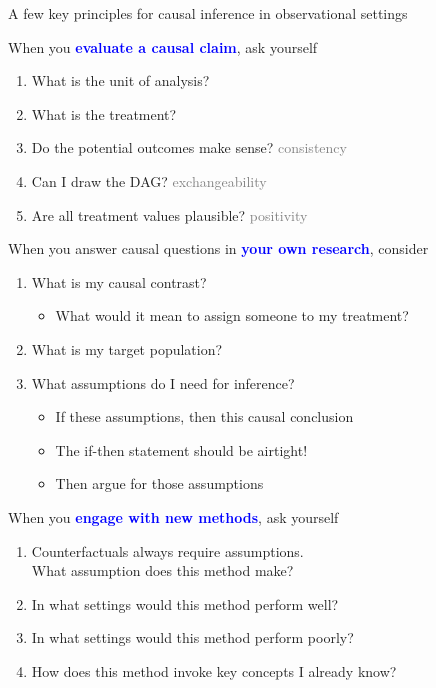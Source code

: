 \documentclass{beamer}
\newcommand\bblue[1]{\textcolor{blue}{\textbf{#1}}}
\begin{document}
\begin{frame}

A few key principles for causal inference in observational settings

\end{frame}

\begin{frame}
When you \bblue{evaluate a causal claim}, ask yourself
\begin{enumerate}
\item What is the unit of analysis?
\item What is the treatment?
\item Do the potential outcomes make sense? \hfill \textcolor{gray}{consistency}
\item Can I draw the DAG? \hfill \textcolor{gray}{exchangeability}
\item Are all treatment values plausible? \hfill \textcolor{gray}{positivity}
\end{enumerate}
\end{frame}

\begin{frame}
When you answer causal questions in \bblue{your own research}, consider
\begin{enumerate}
\item What is my causal contrast?
\begin{itemize}
\item What would it mean to assign someone to my treatment?
\end{itemize}
\item What is my target population?
\item What assumptions do I need for inference?
\begin{itemize}
\item If these assumptions, then this causal conclusion
\item The if-then statement should be airtight!
\item Then argue for those assumptions
\end{itemize}
\end{enumerate}
\end{frame}

\begin{frame}

When you \bblue{engage with new methods}, ask yourself
\begin{enumerate}
\item Counterfactuals always require assumptions.\\What assumption does this method make?
\item In what settings would this method perform well?
\item In what settings would this method perform poorly?
\item How does this method invoke key concepts I already know?
\end{enumerate}

\end{frame}
\end{document}
